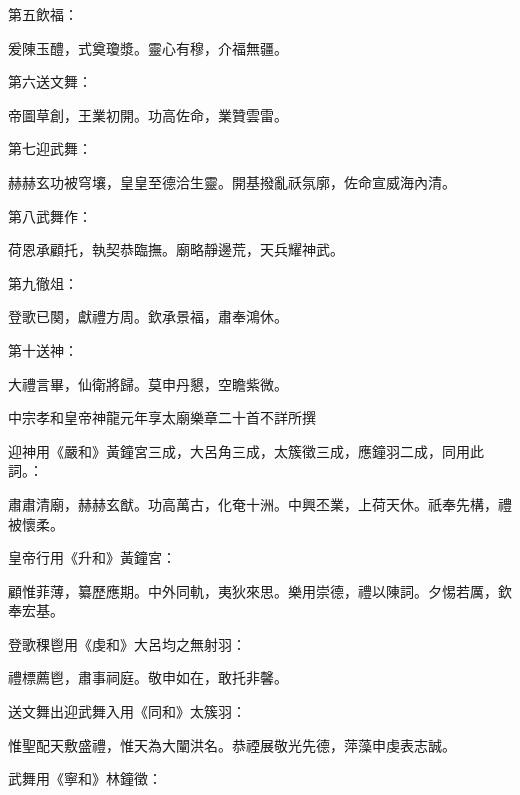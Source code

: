 \begin{pinyinscope}
 第五飲福：



 爰陳玉醴，式奠瓊漿。靈心有穆，介福無疆。



 第六送文舞：



 帝圖草創，王業初開。功高佐命，業贊雲雷。



 第七迎武舞：



 赫赫玄功被穹壤，皇皇至德洽生靈。開基撥亂祅氛廓，佐命宣威海內清。



 第八武舞作：



 荷恩承顧托，執契恭臨撫。廟略靜邊荒，天兵耀神武。



 第九徹俎：



 登歌已闋，獻禮方周。欽承景福，肅奉鴻休。



 第十送神：



 大禮言畢，仙衛將歸。莫申丹懇，空瞻紫微。



 中宗孝和皇帝神龍元年享太廟樂章二十首不詳所撰



 迎神用《嚴和》黃鐘宮三成，大呂角三成，太簇徵三成，應鐘羽二成，同用此詞。：



 肅肅清廟，赫赫玄猷。功高萬古，化奄十洲。中興丕業，上荷天休。祇奉先構，禮被懷柔。



 皇帝行用《升和》黃鐘宮：



 顧惟菲薄，纂歷應期。中外同軌，夷狄來思。樂用崇德，禮以陳詞。夕惕若厲，欽奉宏基。



 登歌稞鬯用《虔和》大呂均之無射羽：



 禮標薦鬯，肅事祠庭。敬申如在，敢托非馨。



 送文舞出迎武舞入用《同和》太簇羽：



 惟聖配天敷盛禮，惟天為大闡洪名。恭禋展敬光先德，萍藻申虔表志誠。



 武舞用《寧和》林鐘徵：




\end{pinyinscope}
